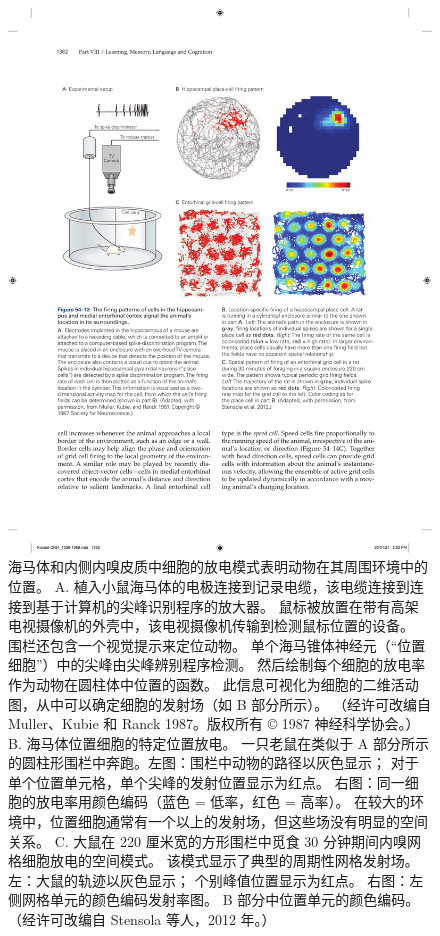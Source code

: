 \begin{figure}[htbp]
	\centering
	\includegraphics[width=0.9\linewidth]{chap54/fig_54_12}
	\caption{海马体和内侧内嗅皮质中细胞的放电模式表明动物在其周围环境中的位置。 A. 植入小鼠海马体的电极连接到记录电缆，该电缆连接到连接到基于计算机的尖峰识别程序的放大器。 鼠标被放置在带有高架电视摄像机的外壳中，该电视摄像机传输到检测鼠标位置的设备。 围栏还包含一个视觉提示来定位动物。 单个海马锥体神经元（“位置细胞”）中的尖峰由尖峰辨别程序检测。 然后绘制每个细胞的放电率作为动物在圆柱体中位置的函数。 此信息可视化为细胞的二维活动图，从中可以确定细胞的发射场（如 B 部分所示）。 （经许可改编自 Muller、Kubie 和 Ranck 1987。版权所有 © 1987 神经科学协会。） B. 海马体位置细胞的特定位置放电。 一只老鼠在类似于 A 部分所示的圆柱形围栏中奔跑。左图：围栏中动物的路径以灰色显示； 对于单个位置单元格，单个尖峰的发射位置显示为红点。 右图：同一细胞的放电率用颜色编码（蓝色 = 低率，红色 = 高率）。 在较大的环境中，位置细胞通常有一个以上的发射场，但这些场没有明显的空间关系。 C. 大鼠在 220 厘米宽的方形围栏中觅食 30 分钟期间内嗅网格细胞放电的空间模式。 该模式显示了典型的周期性网格发射场。 左：大鼠的轨迹以灰色显示； 个别峰值位置显示为红点。 右图：左侧网格单元的颜色编码发射率图。 B 部分中位置单元的颜色编码。（经许可改编自 Stensola 等人，2012 年。）}
	\label{fig:54_12}
\end{figure}


